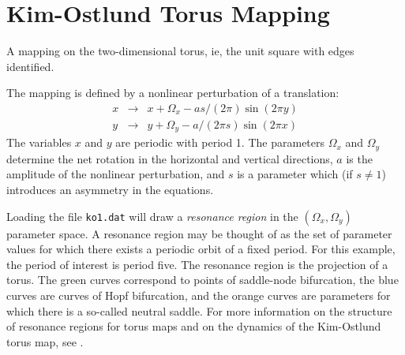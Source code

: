 \section{Kim-Ostlund Torus Mapping}

A mapping on the two-dimensional torus, ie, the unit
square with edges identified.

The mapping is defined by a nonlinear perturbation of
a translation:
\begin{eqnarray*}
	x &\to& x + \Omega_x - a s/(2 \pi) \sin(2 \pi y) \\
        y &\to& y + \Omega_y - a/ (2 \pi s) \sin(2 \pi x)
\end{eqnarray*}
	 The variables  $x$  and  $y$   are periodic with period 1.
The parameters $\Omega_x$ and $\Omega_y$ determine the net rotation in
the horizontal and vertical directions, $a$ is the amplitude of the
nonlinear perturbation, and $s$ is a parameter which (if $s \neq 1$)
introduces an asymmetry in the equations.

Loading the file {\tt ko1.dat} will draw a {\em resonance region} in the
$(\Omega_x, \Omega_y)$ parameter space.  A resonance region may be
thought of as the set of parameter values for which there exists a
periodic orbit of a fixed period.  For this example, the period of
interest is period five.  The resonance region is the projection of a
torus.  The green curves correspond to points of saddle-node
bifurcation, the blue curves are curves of Hopf bifurcation, and the
orange curves are parameters for which there is a so-called neutral
saddle.  For more information on the structure of resonance regions
for torus maps and on the dynamics of the Kim-Ostlund torus map, see
\cite{BGKM}.
